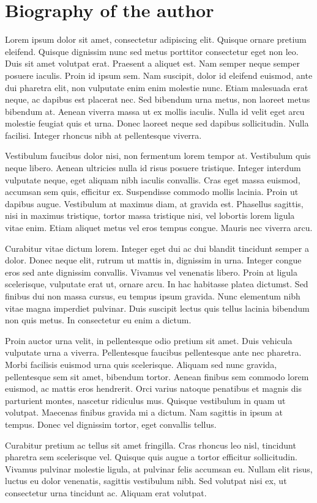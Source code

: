 
\normalsize

\chapter{Biography of the author}

Lorem ipsum dolor sit amet, consectetur adipiscing elit. Quisque ornare pretium eleifend. Quisque dignissim nunc sed metus porttitor consectetur eget non leo. Duis sit amet volutpat erat. Praesent a aliquet est. Nam semper neque semper posuere iaculis. Proin id ipsum sem. Nam suscipit, dolor id eleifend euismod, ante dui pharetra elit, non vulputate enim enim molestie nunc. Etiam malesuada erat neque, ac dapibus est placerat nec. Sed bibendum urna metus, non laoreet metus bibendum at. Aenean viverra massa ut ex mollis iaculis. Nulla id velit eget arcu molestie feugiat quis et urna. Donec laoreet neque sed dapibus sollicitudin. Nulla facilisi. Integer rhoncus nibh at pellentesque viverra.

Vestibulum faucibus dolor nisi, non fermentum lorem tempor at. Vestibulum quis neque libero. Aenean ultricies nulla id risus posuere tristique. Integer interdum vulputate neque, eget aliquam nibh iaculis convallis. Cras eget massa euismod, accumsan sem quis, efficitur ex. Suspendisse commodo mollis lacinia. Proin ut dapibus augue. Vestibulum at maximus diam, at gravida est. Phasellus sagittis, nisi in maximus tristique, tortor massa tristique nisi, vel lobortis lorem ligula vitae enim. Etiam aliquet metus vel eros tempus congue. Mauris nec viverra arcu.

Curabitur vitae dictum lorem. Integer eget dui ac dui blandit tincidunt semper a dolor. Donec neque elit, rutrum ut mattis in, dignissim in urna. Integer congue eros sed ante dignissim convallis. Vivamus vel venenatis libero. Proin at ligula scelerisque, vulputate erat ut, ornare arcu. In hac habitasse platea dictumst. Sed finibus dui non massa cursus, eu tempus ipsum gravida. Nunc elementum nibh vitae magna imperdiet pulvinar. Duis suscipit lectus quis tellus lacinia bibendum non quis metus. In consectetur eu enim a dictum.

Proin auctor urna velit, in pellentesque odio pretium sit amet. Duis vehicula vulputate urna a viverra. Pellentesque faucibus pellentesque ante nec pharetra. Morbi facilisis euismod urna quis scelerisque. Aliquam sed nunc gravida, pellentesque sem sit amet, bibendum tortor. Aenean finibus sem commodo lorem euismod, ac mattis eros hendrerit. Orci varius natoque penatibus et magnis dis parturient montes, nascetur ridiculus mus. Quisque vestibulum in quam ut volutpat. Maecenas finibus gravida mi a dictum. Nam sagittis in ipsum at tempus. Donec vel dignissim tortor, eget convallis tellus.

Curabitur pretium ac tellus sit amet fringilla. Cras rhoncus leo nisl, tincidunt pharetra sem scelerisque vel. Quisque quis augue a tortor efficitur sollicitudin. Vivamus pulvinar molestie ligula, at pulvinar felis accumsan eu. Nullam elit risus, luctus eu dolor venenatis, sagittis vestibulum nibh. Sed volutpat nisi ex, ut consectetur urna tincidunt ac. Aliquam erat volutpat.


\pagebreak
\thispagestyle{empty}
